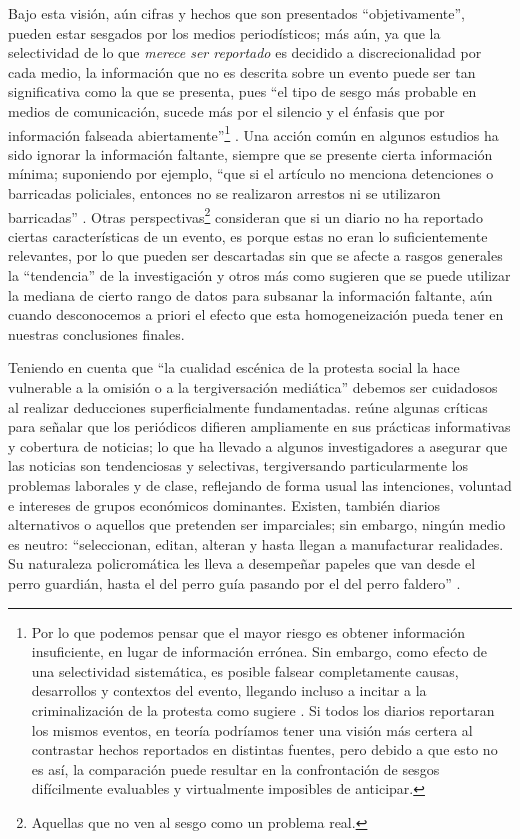 \documentclass[letterpaper, 11pt]{book}
\theoremstyle{definition}
\theoremstyle{remark}
\begin{document}
Bajo esta visión, aún cifras y hechos que son presentados ``objetivamente'', pueden estar sesgados por los medios periodísticos; más aún, ya que la selectividad de lo que \emph{merece ser reportado} es decidido a discrecionalidad por cada medio, la información que no es descrita sobre un evento puede ser tan significativa como la que se presenta, pues ``el tipo de sesgo más probable en medios de comunicación, sucede más por el silencio y el énfasis que por información falseada abiertamente''\footnote{
    Por lo que podemos pensar que el mayor riesgo es obtener información insuficiente, en lugar de información errónea. Sin embargo, como efecto de una selectividad sistemática, es posible falsear completamente causas, desarrollos y contextos del evento, llegando incluso a incitar a la criminalización de la protesta como sugiere \citet{2013_Rovira_ActivismoMediatico}. 
    Si todos los diarios reportaran los mismos eventos, en teoría podríamos tener una visión más certera al contrastar hechos reportados en distintas fuentes, pero debido a que esto no es así, la comparación puede resultar en la confrontación de sesgos difícilmente evaluables y virtualmente imposibles de anticipar.
} \citep[7]{1987_Franzosi_Press}.
Una acción común en algunos estudios ha sido ignorar la información faltante, siempre que se presente cierta información mínima; suponiendo por ejemplo, ``que si el artículo no menciona detenciones o barricadas policiales, entonces no se realizaron arrestos ni se utilizaron barricadas'' \citep[403--404]{2005_Ortiz_NewspaperData}. 
Otras perspectivas\footnote{
    Aquellas que no ven al sesgo como un problema real.
} consideran que si un diario no ha reportado ciertas características de un evento, es porque estas no eran lo suficientemente relevantes, por lo que pueden ser descartadas sin que se afecte a rasgos generales la ``tendencia'' de la investigación y otros más como \citet{2002_Koopmans_AEP} sugieren que se puede utilizar la mediana de cierto rango de datos para subsanar la información faltante, aún cuando desconocemos a priori el efecto que esta homogeneización pueda tener en nuestras conclusiones finales.


Teniendo en cuenta que ``la cualidad escénica de la protesta social la hace vulnerable a la omisión o a la tergiversación mediática'' \citep[35]{2013_Rovira_ActivismoMediatico} debemos ser cuidadosos al realizar deducciones superficialmente fundamentadas.  
\citet{1987_Franzosi_Press} reúne algunas críticas para señalar que los periódicos difieren ampliamente en sus prácticas informativas y cobertura de noticias; lo que ha llevado a algunos investigadores a asegurar que las noticias son tendenciosas y selectivas, tergiversando particularmente los problemas laborales y de clase, reflejando de forma usual las intenciones, voluntad e intereses de grupos económicos dominantes. 
Existen, también diarios alternativos o aquellos que pretenden ser imparciales; sin embargo, ningún medio es neutro: ``seleccionan, editan, alteran y hasta llegan a manufacturar realidades. Su naturaleza policromática les lleva a desempeñar papeles que van desde el perro guardián, hasta el del perro guía pasando por el del perro faldero'' \citep[7]{2008_ASF_Medios}.
\end{document}
